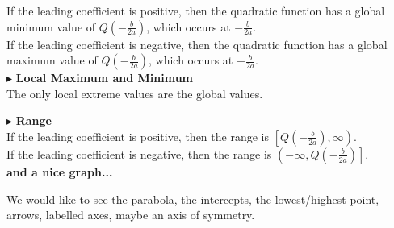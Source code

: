 \documentclass{ximera}
\begin{document}
If the leading coefficient is positive, then the quadratic function has a global minimum value of $Q\left( -\frac{b}{2a} \right)$, which occurs at $-\frac{b}{2a}$. \\




If the leading coefficient is negative, then the quadratic function has a global maximum value of $Q\left( -\frac{b}{2a} \right)$, which occurs at $-\frac{b}{2a}$. \\








$\blacktriangleright$  \textbf{\textcolor{red!10!blue!90!}{Local Maximum and Minimum}} \\

 The only local extreme values are the global values.




$\blacktriangleright$ \textbf{\textcolor{red!10!blue!90!}{Range}} \\

If the leading coefficient is positive, then the range is $\left[ Q\left( -\frac{b}{2a} \right), \infty \right)$. \\


If the leading coefficient is negative, then the range is $\left(-\infty, Q\left( -\frac{b}{2a} \right) \right]$. \\












\textbf{\textcolor{purple!85!blue}{and a nice graph...}} 


We would like to see the parabola, the intercepts, the lowest/highest point, arrows, labelled axes, maybe an axis of symmetry.
\end{document}
